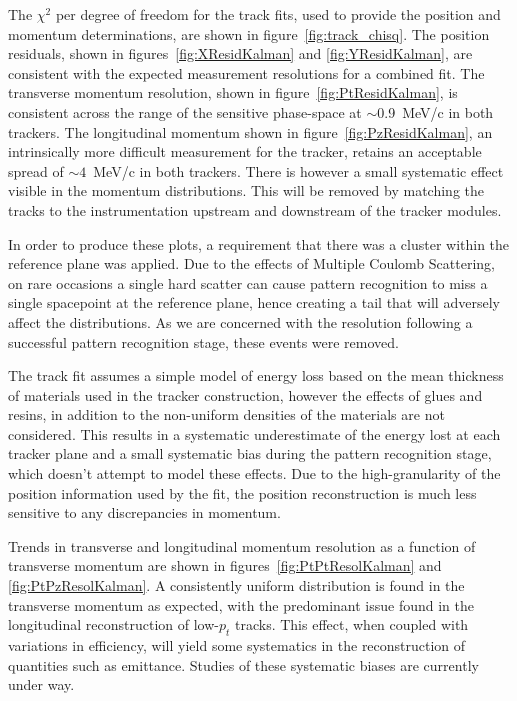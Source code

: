   The $\chi^2$ per degree of freedom for the track fits, used to provide the position and momentum determinations, are shown in figure~\ref{fig:track_chisq}. 
  The position residuals, shown in figures~\ref{fig:XResidKalman} and \ref{fig:YResidKalman}, are consistent with the expected measurement resolutions for a combined fit. The transverse momentum resolution, shown in figure~\ref{fig:PtResidKalman}, is consistent across the range of the sensitive phase-space at $\sim$0.9~MeV/c in both trackers. The longitudinal momentum shown in figure~\ref{fig:PzResidKalman}, an intrinsically more difficult measurement for the tracker, retains an acceptable spread of ${\sim4}$~MeV/c in both trackers. There is however a small systematic effect visible in the momentum distributions. This will be removed by matching the tracks to the instrumentation upstream and downstream of the tracker modules.

  In order to produce these plots, a requirement that there was a cluster within the reference plane was applied. Due to the effects of Multiple Coulomb Scattering, on rare occasions a single hard scatter can cause pattern recognition to miss a single spacepoint at the reference plane, hence creating a tail that will adversely affect the distributions. As we are concerned with the resolution following a successful pattern recognition stage, these events were removed.
  
  The track fit assumes a simple model of energy loss based on the mean thickness of materials used in the tracker construction, however the effects of glues and resins, in addition to the non-uniform densities of the materials are not considered. This results in a systematic underestimate of the energy lost at each tracker plane and a small systematic bias during the pattern recognition stage, which doesn't attempt to model these effects. Due to the high-granularity of the position information used by the fit, the position reconstruction is much less sensitive to any discrepancies in momentum. %
 
  Trends in transverse and longitudinal momentum resolution as a function of transverse momentum are shown in figures~\ref{fig:PtPtResolKalman} and \ref{fig:PtPzResolKalman}. A consistently uniform distribution is found in the transverse momentum as expected, with the predominant issue found in the longitudinal reconstruction of low-$p_t$ tracks. This effect, when coupled with variations in efficiency, will yield some systematics in the reconstruction of quantities such as emittance\cite{ChrisRogersThesis}. Studies of these systematic biases are currently under way.
